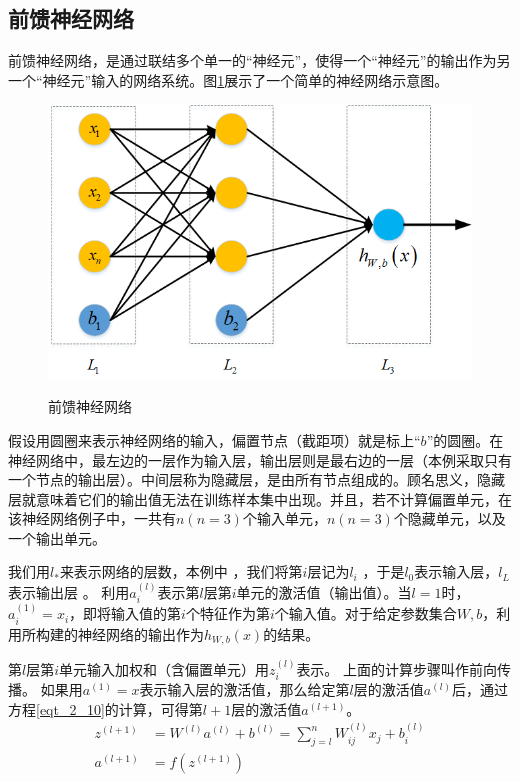 \subsection{前馈神经网络}
前馈神经网络，是通过联结多个单一的“神经元”，使得一个“神经元”的输出作为另一个“神经元”输入的网络系统。图\ref{sec:fig_2_4}展示了一个简单的神经网络示意图。\par
\begin{figure}
	\centering
	\includegraphics[scale=0.7]{figures/chapter_2/fig_2_4}\label{sec:fig_2_4}
	\caption{前馈神经网络}\label{sec:fig_2_4}
\end{figure}
假设用圆圈来表示神经网络的输入，偏置节点（截距项）就是标上“$b$”的圆圈。在神经网络中，最左边的一层作为输入层，输出层则是最右边的一层（本例采取只有一个节点的输出层）。中间层称为隐藏层，是由所有节点组成的。顾名思义，隐藏层就意味着它们的输出值无法在训练样本集中出现。并且，若不计算偏置单元，在该神经网络例子中，一共有$n(n=3)$个输入单元，$n(n=3)$个隐藏单元，以及一个输出单元。\par

 我们用$l_{*}$来表示网络的层数，本例中 ，我们将第$i$层记为$l_i$ ，于是$l_{0}$表示输入层，$l_L$表示输出层 。
利用$a^{(l)}_i$表示第$l$层第$i$单元的激活值（输出值）。当$l=1$时，$a^{(1)}_i = x_i$，即将输入值的第$i$个特征作为第$i$个输入值。对于给定参数集合$W,b$，利用所构建的神经网络的输出作为$h_{W,b}(x)$的结果。\par
 
第$l$层第$i$单元输入加权和（含偏置单元）用$z^{(l)}_i$表示。
上面的计算步骤叫作前向传播。
如果用$a^{(1)} = x$表示输入层的激活值，那么给定第$l$层的激活值$a^{(l)}$后，通过方程\eqref{eqt_2_10}的计算，可得第$l+1$层的激活值$a^{(l+1)}$。
\begin{align}
	\label{eqt_2_10}
	z^{(l+1)} &= W^{(l)} a^{(l)} + b^{(l)}=\sum_{j=l}^n W^{(l)}_{ij} x_j + b^{(l)}_i\\
	a^{(l+1)} &= f(z^{(l+1)})
\end{align}

